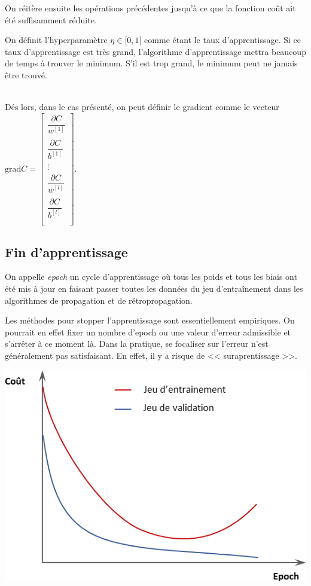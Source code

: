 On réitère ensuite les opérations précédentes jusqu'à ce que la fonction coût ait été suffisamment réduite.

\begin{defi}
On définit l'hyperparamètre $\eta\in[0,1[$ comme étant le taux d'apprentissage. Si ce taux d'apprentissage est très grand, l'algorithme d'apprentissage mettra beaucoup de temps à trouver le minimum. S'il est trop grand, le minimum peut ne jamais être trouvé. 

\end{defi}


\begin{defi}[Gradient] ~\\
Dés lors, dans le cas présenté, on peut définir le gradient comme le vecteur
$\text{grad} C = \begin{bmatrix}
\dfrac{\partial C}{w^{[1]}_{}} \\
\dfrac{\partial C}{b^{[1]}_{}} \\
\vdots
\\
\dfrac{\partial C}{w^{[l]}_{}} \\
\dfrac{\partial C}{b^{[l]}_{}} \\

\end{bmatrix}
$.


\end{defi}

\subsection{Fin d'apprentissage}

\begin{defi}[Epoch]
On appelle \textit{epoch} un cycle d'apprentissage où tous les poids et tous les biais ont été mis à jour en faisant passer toutes les données du jeu d’entraînement dans les algorithmes de propagation et de rétropropagation.
\end{defi}

Les méthodes pour stopper l'apprentissage sont essentiellement empiriques. On pourrait en effet fixer un nombre d'epoch ou une valeur d'erreur admissible et s'arrêter à ce moment là. Dans la pratique, se focaliser sur l'erreur n'est généralement pas satisfaisant. En effet, il y a risque de << suraprentissage >>.

\begin{center}
\includegraphics[width=.6\linewidth]{images/fig_06_overfitting}
\end{center}

